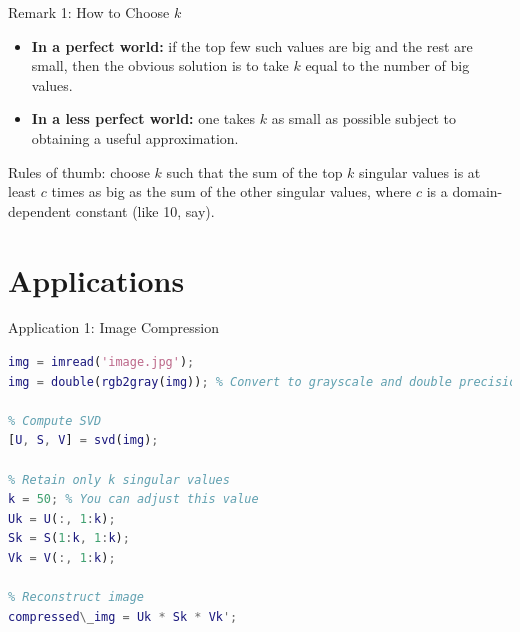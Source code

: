 \documentclass[aspectratio=169,xcolor=dvipsnames]{beamer}
\begin{document}
\begin{frame}{Remark 1: How to Choose $k$}
\begin{itemize}
    \item \textbf{In a perfect world:} if the top few such values are big and the rest are small, then the obvious solution is to take $k$ equal to the number of big values.
    \item \textbf{In a less perfect world:} one takes $k$ as small as possible subject to obtaining a useful approximation.
\end{itemize}
\vspace{1cm}
Rules of thumb: choose $k$ such that the sum of the top $k$ singular values is at least $c$ times as big as the sum of the other singular values, where $c$ is a domain-dependent constant (like
10, say).
\end{frame}

\section{Applications}
\begin{frame}[fragile]{Application 1: Image Compression}
\begin{lstlisting}[language=Matlab]
% Load image
img = imread('image.jpg');
img = double(rgb2gray(img)); % Convert to grayscale and double precision

% Compute SVD
[U, S, V] = svd(img);

% Retain only k singular values
k = 50; % You can adjust this value
Uk = U(:, 1:k);
Sk = S(1:k, 1:k);
Vk = V(:, 1:k);

% Reconstruct image
compressed\_img = Uk * Sk * Vk';
\end{lstlisting}
\end{frame}
\end{document}
